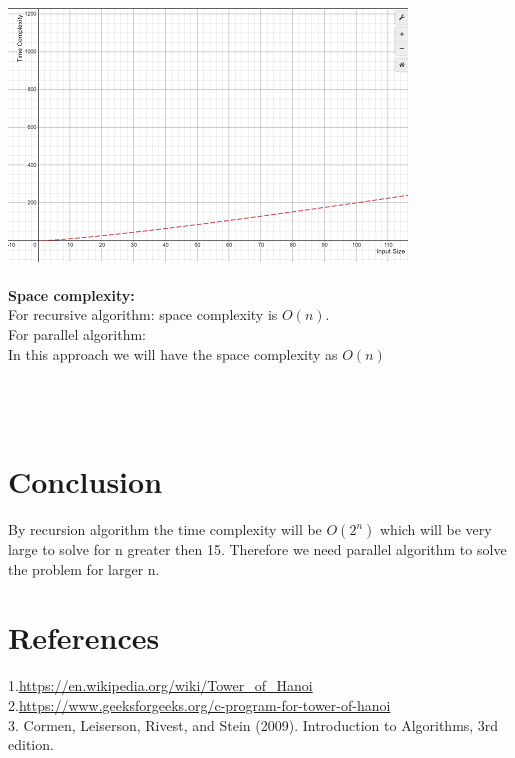 \documentclass[conference]{IEEEtran}
\begin{document}
\\
\includegraphics{time_comp}\\\\
\textbf{Space complexity:}\\
For recursive algorithm: space complexity is $O(n)$.\\
For parallel algorithm:\\
In this  approach we will have the space complexity as $O(n)$\\\\
\\\\


\section{Conclusion}
By recursion algorithm the time complexity will be $O(2^n)$ which will be very large to solve for n greater then 15.
Therefore we need parallel algorithm to solve the problem for larger n.
 \section{References}
\color{blue}1.{\url{https://en.wikipedia.org/wiki/Tower_of_Hanoi} }\\
2.{\url{https://www.geeksforgeeks.org/c-program-for-tower-of-hanoi}}\\
3. Cormen, Leiserson, Rivest, and Stein (2009). Introduction to Algorithms, 3rd edition.
\end{document}
